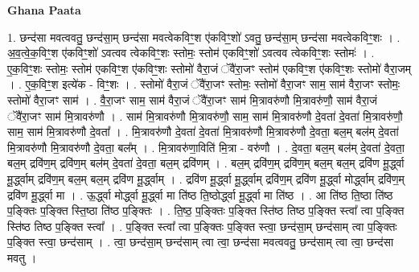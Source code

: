 \documentclass[17pt]{extarticle}
\begin{document}
\textbf{Ghana Paata } \newline

1. छन्द॑सा मवत्ववतु॒ छन्द॑सा॒म् छन्द॑सा मवत्वेकविꣳ॒॒श ए॑कविꣳ॒॒शो॑ ऽवतु॒ छन्द॑सा॒म् छन्द॑सा मवत्वेकविꣳ॒॒शः । . अ॒व॒त्वे॒क॒विꣳ॒॒श ए॑कविꣳ॒॒शो॑ ऽवत्वव त्वेकविꣳ॒॒शः स्तोमः॒ स्तोम॑ एकविꣳ॒॒शो॑ ऽवत्वव त्वेकविꣳ॒॒शः स्तोमः॑ । . ए॒क॒विꣳ॒॒शः स्तोमः॒ स्तोम॑ एकविꣳ॒॒श ए॑कविꣳ॒॒शः स्तोमो॑ वैरा॒जं ॅवै॑रा॒जꣳ स्तोम॑ एकविꣳ॒॒श ए॑कविꣳ॒॒शः स्तोमो॑ वैरा॒जम् । . ए॒क॒विꣳ॒॒श इत्ये॑क - विꣳ॒॒शः । . स्तोमो॑ वैरा॒जं ॅवै॑रा॒जꣳ स्तोमः॒ स्तोमो॑ वैरा॒जꣳ साम॒ साम॑ वैरा॒जꣳ स्तोमः॒ स्तोमो॑ वैरा॒जꣳ साम॑ । . वै॒रा॒जꣳ साम॒ साम॑ वैरा॒जं ॅवै॑रा॒जꣳ साम॑ मि॒त्रावरु॑णौ मि॒त्रावरु॑णौ॒ साम॑ वैरा॒जं ॅवै॑रा॒जꣳ साम॑ मि॒त्रावरु॑णौ । . साम॑ मि॒त्रावरु॑णौ मि॒त्रावरु॑णौ॒ साम॒ साम॑ मि॒त्रावरु॑णौ दे॒वता॑ दे॒वता॑ मि॒त्रावरु॑णौ॒ साम॒ साम॑ मि॒त्रावरु॑णौ दे॒वता᳚ । . मि॒त्रावरु॑णौ दे॒वता॑ दे॒वता॑ मि॒त्रावरु॑णौ मि॒त्रावरु॑णौ दे॒वता॒ बल॒म् बल॑म् दे॒वता॑ मि॒त्रावरु॑णौ मि॒त्रावरु॑णौ दे॒वता॒ बल᳚म् । . मि॒त्रावरु॑णा॒विति॑ मि॒त्रा - वरु॑णौ । . दे॒वता॒ बल॒म् बल॑म् दे॒वता॑ दे॒वता॒ बल॒म् द्रवि॑ण॒म् द्रवि॑ण॒म् बल॑म् दे॒वता॑ दे॒वता॒ बल॒म् द्रवि॑णम् । . बल॒म् द्रवि॑ण॒म् द्रवि॑ण॒म् बल॒म् बल॒म् द्रवि॑ण मू॒र्द्ध्वा मू॒र्द्ध्वाम् द्रवि॑ण॒म् बल॒म् बल॒म् द्रवि॑ण मू॒र्द्ध्वाम् । . द्रवि॑ण मू॒र्द्ध्वा मू॒र्द्ध्वाम् द्रवि॑ण॒म् द्रवि॑ण मू॒र्द्ध्वा मोर्द्ध्वाम् द्रवि॑ण॒म् द्रवि॑ण मू॒र्द्ध्वा मा । . ऊ॒र्द्ध्वा मोर्द्ध्वा मू॒र्द्ध्वा मा ति॑ष्ठ ति॒ष्ठोर्द्ध्वा मू॒र्द्ध्वा मा ति॑ष्ठ । . आ ति॑ष्ठ ति॒ष्ठा ति॑ष्ठ प॒ङ्क्तिः प॒ङ्क्ति स्ति॒ष्ठा ति॑ष्ठ प॒ङ्क्तिः । . ति॒ष्ठ॒ प॒ङ्क्तिः प॒ङ्क्ति स्ति॑ष्ठ तिष्ठ प॒ङ्क्ति स्त्वा᳚ त्वा प॒ङ्क्ति स्ति॑ष्ठ तिष्ठ प॒ङ्क्ति स्त्वा᳚ । . प॒ङ्क्ति स्त्वा᳚ त्वा प॒ङ्क्तिः प॒ङ्क्ति स्त्वा॒ छन्द॑सा॒म् छन्द॑साम् त्वा प॒ङ्क्तिः प॒ङ्क्ति स्त्वा॒ छन्द॑साम् । . त्वा॒ छन्द॑सा॒म् छन्द॑साम् त्वा त्वा॒ छन्द॑सा मवत्ववतु॒ छन्द॑साम् त्वा त्वा॒ छन्द॑सा मवतु । \newline
\end{document}
